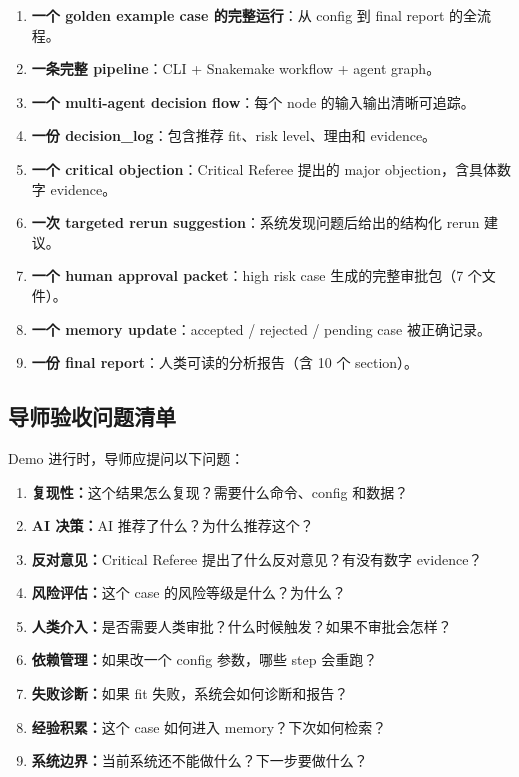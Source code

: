 \documentclass[11pt,a4paper,fontset=fandol]{ctexart}
\begin{document}
\begin{enumerate}
  \item \textbf{一个 golden example case 的完整运行}：从 config 到 final report 的全流程。
  \item \textbf{一条完整 pipeline}：CLI + Snakemake workflow + agent graph。
  \item \textbf{一个 multi-agent decision flow}：每个 node 的输入输出清晰可追踪。
  \item \textbf{一份 decision\_log}：包含推荐 fit、risk level、理由和 evidence。
  \item \textbf{一个 critical objection}：Critical Referee 提出的 major objection，含具体数字 evidence。
  \item \textbf{一次 targeted rerun suggestion}：系统发现问题后给出的结构化 rerun 建议。
  \item \textbf{一个 human approval packet}：high risk case 生成的完整审批包（7 个文件）。
  \item \textbf{一个 memory update}：accepted / rejected / pending case 被正确记录。
  \item \textbf{一份 final report}：人类可读的分析报告（含 10 个 section）。
\end{enumerate}

\subsection{导师验收问题清单}

Demo 进行时，导师应提问以下问题：

\begin{enumerate}
  \item \textbf{复现性：}这个结果怎么复现？需要什么命令、config 和数据？
  \item \textbf{AI 决策：}AI 推荐了什么？为什么推荐这个？
  \item \textbf{反对意见：}Critical Referee 提出了什么反对意见？有没有数字 evidence？
  \item \textbf{风险评估：}这个 case 的风险等级是什么？为什么？
  \item \textbf{人类介入：}是否需要人类审批？什么时候触发？如果不审批会怎样？
  \item \textbf{依赖管理：}如果改一个 config 参数，哪些 step 会重跑？
  \item \textbf{失败诊断：}如果 fit 失败，系统会如何诊断和报告？
  \item \textbf{经验积累：}这个 case 如何进入 memory？下次如何检索？
  \item \textbf{系统边界：}当前系统还不能做什么？下一步要做什么？
\end{enumerate}
\end{document}
